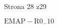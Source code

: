 \documentclass[a4paper,12pt]{article}
\begin{document}
Strona 28 z29

$\mathrm{E}\mathrm{M}\mathrm{A}\mathrm{P}-\mathrm{R}0_{-}10$
\end{document}
